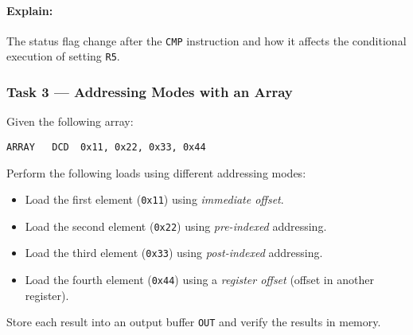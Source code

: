 \paragraph{Explain:} The status flag change after the \texttt{CMP} instruction and how it affects the conditional execution of setting \texttt{R5}.

\subsubsection{Task 3 --- Addressing Modes with an Array}
Given the following array:
\begin{lstlisting}
ARRAY   DCD  0x11, 0x22, 0x33, 0x44
\end{lstlisting}

Perform the following loads using different addressing modes:
\begin{itemize}[nosep]
    \item Load the first element (\texttt{0x11}) using \emph{immediate offset}.
    \item Load the second element (\texttt{0x22}) using \emph{pre-indexed} addressing.
    \item Load the third element (\texttt{0x33}) using \emph{post-indexed} addressing.
    \item Load the fourth element (\texttt{0x44}) using a \emph{register offset} (offset in another register).
\end{itemize}

Store each result into an output buffer \texttt{OUT} and verify the results in memory.

